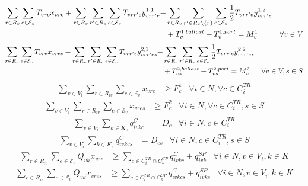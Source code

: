 \documentclass[11pt,english]{article}
\begin{document}
\begin{align}
    \sum_{r \in R_{v}} \sum_{e \in \mathcal{E}_{v}} T_{vre} x_{vre} + \sum_{r \in R_{v}} \sum_{r' \in R_{v}} \sum_{e \in \mathcal{E}_{v}} T_{vrr'e} y_{vrr'e}^{1,1} + & \sum_{r \in R_{v}} \sum_{r' \in R_{v} \setminus \{r\} } \sum_{e \in \mathcal{E}_{v}} \frac{1}{2} T_{vrr'e} y_{vrr'e}^{1,2} \notag \\ & + T_{v}^{1,ballast} + T_{v}^{1,port} = M_{v}^{1} & \forall v \in V \label{eq:service-days_1}
\end{align}
\begin{align}
    \sum_{r \in R_{v}} \sum_{e \in \mathcal{E}_{v}} T_{vre} x_{vres} + \sum_{r \in R_{v}} \sum_{r' \in R_{v}} \sum_{e \in \mathcal{E}_{v}} T_{vrr'e} y_{vrr'es}^{2,1} + & \sum_{r \in R_{v}} \sum_{r' \in R_{v}} \sum_{e \in \mathcal{E}_{v}} \frac{1}{2} T_{vrr'e} y_{vrr'es}^{2,2} \notag \\ & + T_{vs}^{2,ballast} + T_{vs}^{2,port} = M_{v}^{2} & \forall v \in V, s \in S \label{eq:service-days_2}
\end{align}
\begin{align}
    \sum_{v \in V_i} \sum_{r \in R_{iv}} \sum_{e \in \mathcal{E}_{v}} x_{vre} &\geq F_c^{1} & \forall i \in N, \forall c \in C_{i}^{TR} \label{eq:contract-frequency_1}
\end{align}
\begin{align}
    \sum_{v \in V_i} \sum_{r \in R_{iv}} \sum_{e \in \mathcal{E}_{v}} x_{vres} &\geq F_c^{2} & \forall i \in N, \forall c \in C_{i}^{TR}, s \in S \label{eq:contract-frequency_2}
\end{align}
\begin{align}
    \sum_{v \in V_i} \sum_{k \in K_c} q^{C}_{ivkc} &= D_c & \forall i \in N, c \in C_{i}^{TR} \label{eq:contract-demand_1}
\end{align}
\begin{align}
    \sum_{v \in V_i} \sum_{k \in K_c} q^{C}_{ivkcs} &= D_{cs} & \forall i \in N, c \in C_{i}^{TR}, s \in S \label{eq:contract-demand_2}
\end{align}
\begin{align}
    \sum_{r \in R_{iv}} \sum_{e \in \mathcal{E}_v}  Q_{vk} x_{vre} &\geq \sum_{c \in C^{TR}_{i} \cap C^{CP}_k} q^{C}_{ivkc} + q_{ivk}^{SP} & \forall i \in N, v \in V_i, k \in K \label{eq:capacity_1}
\end{align}
\begin{align}
    \sum_{r \in R_{iv}} \sum_{e \in \mathcal{E}_v} Q_{vk} x_{vres} &\geq \sum_{c \in C^{TR}_{i} \cap C^{CP}_k} q^{C}_{ivkcs} + q_{ivks}^{SP} & \forall i \in N, v \in V_i, k \in K \label{eq:capacity_2}
\end{align}
\end{document}
